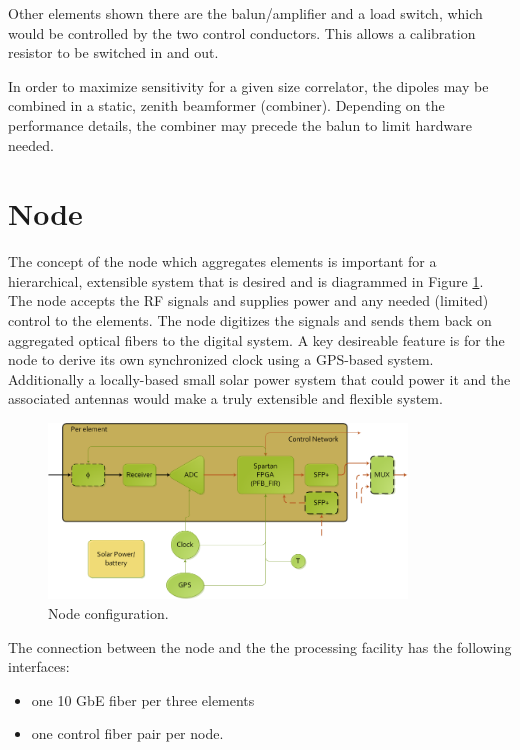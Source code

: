 \documentclass[11pt]{article}
\begin{document}
Other elements shown there are the balun/amplifier and a load switch, which
would be controlled by the two control conductors.  This allows a calibration
resistor to be switched in and out.

In order to maximize sensitivity for a given size correlator, the dipoles may
be combined in a static, zenith beamformer (combiner).  Depending on the
performance details, the combiner may precede the balun to limit hardware
needed.

\section{Node}

The concept of the node which aggregates elements is important for a
hierarchical, extensible system that is desired and is diagrammed in Figure
\ref{fig:node}.  The node accepts the RF signals and supplies power and any
needed (limited) control to the elements.  The node digitizes the signals and
sends them back on aggregated optical fibers to the digital system.  A key
desireable feature is for the node to derive its own synchronized clock using a
GPS-based system.  Additionally a locally-based small solar power system that
could power it and the associated antennas would make a truly extensible and
flexible system.

\begin{figure}[h]
\centering
\includegraphics[width=0.85\textwidth]{plots/Node.png}
\caption{Node configuration.}
\label{fig:node}
\end{figure}

The connection between the node and the the processing facility has the following interfaces:
\begin{itemize}
\item one 10 GbE fiber per three elements
\item one control fiber pair per node.
\end{itemize}
\end{document}
